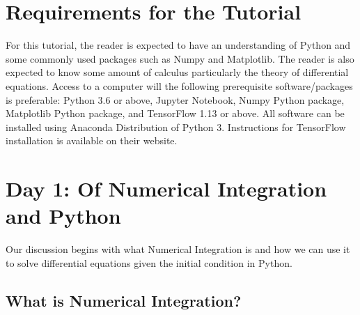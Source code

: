 \documentclass[10pt,letterpaper]{article}
\begin{document}
\section*{Requirements for the Tutorial}

For this tutorial, the reader is expected to have an understanding of Python and some commonly used packages such as Numpy and Matplotlib. The reader is also expected to know some amount of calculus particularly the theory of differential equations. Access to a computer will the following prerequisite software/packages is preferable: Python 3.6 or above, Jupyter Notebook, Numpy Python package, Matplotlib Python package, and TensorFlow 1.13 or above. All software can be installed using Anaconda Distribution of Python 3. Instructions for TensorFlow installation is available on their website.



\section*{Day 1: Of Numerical Integration and Python}

Our discussion begins with what Numerical Integration is and how we can use it to solve differential equations given the initial condition in Python.

\subsection*{What is Numerical Integration?}
\end{document}
